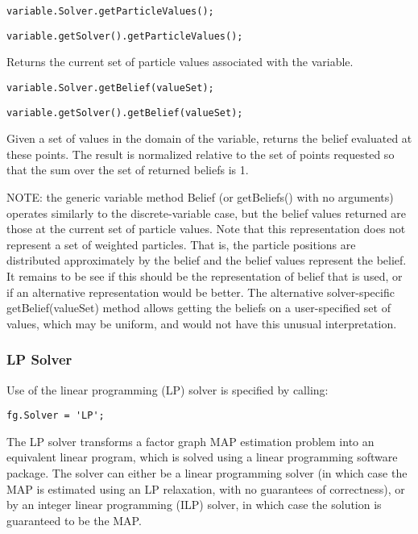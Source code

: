 \ifmatlab
\begin{lstlisting}
variable.Solver.getParticleValues();
\end{lstlisting}
\fi

\ifjava
\begin{lstlisting}
variable.getSolver().getParticleValues();
\end{lstlisting}
\fi

Returns the current set of particle values associated with the variable.

\ifmatlab
\begin{lstlisting}
variable.Solver.getBelief(valueSet);
\end{lstlisting}
\fi

\ifjava
\begin{lstlisting}
variable.getSolver().getBelief(valueSet);
\end{lstlisting}
\fi

Given a set of values in the domain of the variable, returns the belief evaluated at these points. The result is normalized relative to the set of points requested so that the sum over the set of returned beliefs is 1.

NOTE: the generic variable method Belief (or getBeliefs() with no arguments) operates similarly to the discrete-variable case, but the belief values returned are those at the current set of particle values. Note that this representation does not represent a set of weighted particles. That is, the particle positions are distributed approximately by the belief and the belief values represent the belief. It remains to be see if this should be the representation of belief that is used, or if an alternative representation would be better. The alternative solver-specific getBelief(valueSet) method allows getting the beliefs on a user-specified set of values, which may be uniform, and would not have this unusual interpretation.



\subsubsection{LP Solver}
\label{sec:LPSolver}

\ifmatlab
Use of the linear programming (LP) solver is specified by calling:

\begin{lstlisting}
fg.Solver = 'LP';
\end{lstlisting}

The LP solver transforms a factor graph MAP estimation problem into an equivalent linear program, which is solved using a linear programming software package. The solver can either be a linear programming solver (in which case the MAP is estimated using an LP relaxation, with no guarantees of correctness), or by an integer linear programming (ILP) solver, in which case the solution is guaranteed to be the MAP. 


